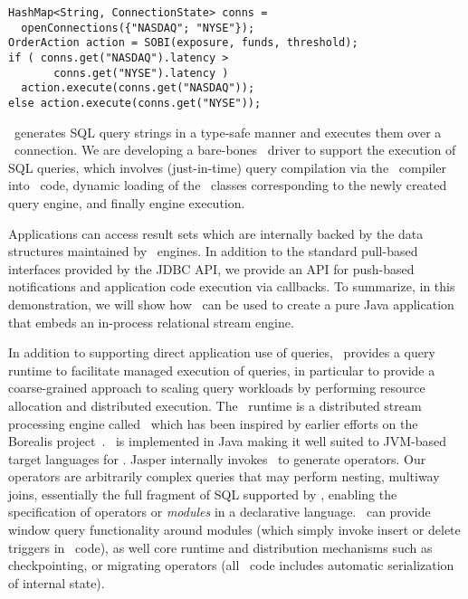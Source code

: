 \begin{verbatim}
HashMap<String, ConnectionState> conns =
  openConnections({"NASDAQ"; "NYSE"});
OrderAction action = SOBI(exposure, funds, threshold);
if ( conns.get("NASDAQ").latency >
       conns.get("NYSE").latency )
  action.execute(conns.get("NASDAQ"));
else action.execute(conns.get("NYSE"));
\end{verbatim}

\dsl\ generates SQL query strings in a type-safe manner and executes them
over a \driver\ connection. We are developing a bare-bones \driver\ driver to
support the execution of SQL queries, which involves (just-in-time) query
compilation via the \compiler\ compiler into \targetlang\ code, dynamic loading
of the \targetlang\ classes corresponding to the newly created query engine, and
finally engine execution.


Applications can access
result sets which are internally backed by the data structures maintained by
\compiler\ engines. In addition to the standard pull-based interfaces provided
by the JDBC API, we provide an API for push-based notifications and application
code execution via callbacks. 
To summarize, in this demonstration, we will show how \compiler\ can be used to
create a pure Java application that embeds an in-process relational stream
engine.


In addition to supporting direct application use of queries, \compiler\ provides
a query runtime to facilitate managed execution of queries, in particular to
provide a coarse-grained approach to scaling query workloads by performing
resource allocation and distributed execution. The \compiler\ runtime is a
distributed stream processing engine called \spe\ which has been inspired by
earlier efforts on the Borealis project~\cite{borealis-design:05}. \spe\ is
implemented in Java making it well suited to JVM-based target
languages for \compiler. Jasper internally invokes \compiler\ to generate
operators. Our operators are arbitrarily complex queries that may
perform nesting, multiway joins, essentially the full fragment of SQL
supported by \compiler, enabling the specification of operators or
\textit{modules} in a declarative language. \spe\ can provide window query
functionality around modules (which simply invoke insert or delete triggers in
\compiler\ code), as well core runtime and distribution mechanisms such as
checkpointing, or migrating operators (all \compiler\ code includes
automatic serialization of internal state).

